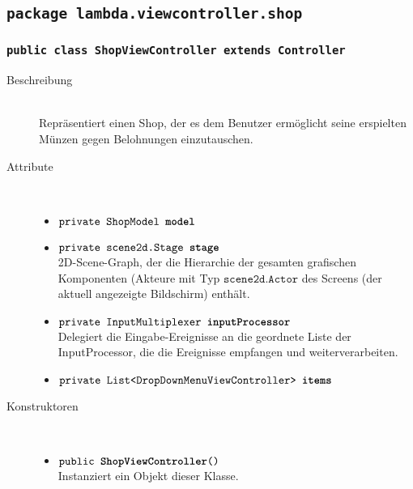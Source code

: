 	




\subsection{\texttt{package lambda.viewcontroller.shop}}

\subsubsection{\normalfont \texttt{public class \textbf{ShopViewController} extends Controller}}

\begin{description}
\item[Beschreibung] \hfill \\ Repräsentiert einen Shop, der es dem Benutzer ermöglicht seine erspielten Münzen gegen Belohnungen einzutauschen.

\item[Attribute] \hfill \\
	\vspace{-.8cm}
	\begin{itemize}	
		\item $\texttt{private ShopModel \textbf{model}}$ \\ 
		\item $\texttt{private scene2d.Stage \textbf{stage}}$ \\ 2D-Scene-Graph, der die Hierarchie der gesamten grafischen Komponenten (Akteure mit Typ $\texttt{scene2d.Actor}$ des Screens (der aktuell angezeigte Bildschirm) enthält. 
		\item $\texttt{private InputMultiplexer \textbf{inputProcessor}}$ \\ Delegiert die Eingabe-Ereignisse an die geordnete Liste der InputProcessor, die die Ereignisse empfangen und weiterverarbeiten.
		\item $\texttt{private List<DropDownMenuViewController> \textbf{items}}$ \\ 
		\end{itemize}
	
\item[Konstruktoren] \hfill \\
	\vspace{-.8cm}
	\begin{itemize}
		\item $\texttt{public \textbf{ShopViewController}()}$ \\ Instanziert ein Objekt dieser Klasse.


\end{itemize}
\end{description}
